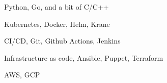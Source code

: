 \item Python, Go, and a bit of C/C++
\item Kubernetes, Docker, Helm, Krane
\item CI/CD, Git, Github Actions, Jenkins
\item Infrastructure as code, Ansible, Puppet, Terraform
\item AWS, GCP
